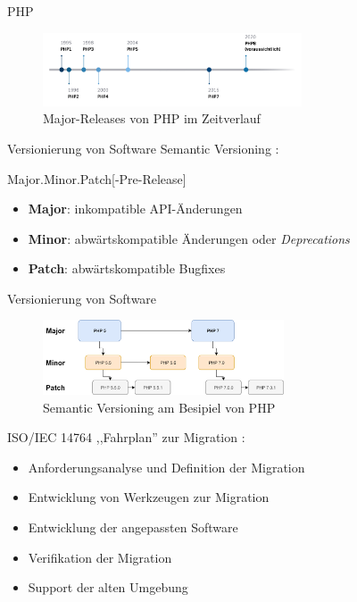 \begin{frame}{PHP}
    \begin{figure}
        \centering
        \includegraphics[width=290px]{img/timeline.png}	
        \caption{Major-Releases von PHP im Zeitverlauf}		
    \end{figure}
\end{frame}

\begin{frame}{Versionierung von Software}
    Semantic Versioning \nocite{preston-werner_semantic_nodate}:
    \begin{center}
        \alert{Major.Minor.Patch[-Pre-Release]}
    \end{center}
    \begin{itemize}
        \item \textbf{Major}: inkompatible API-Änderungen
        \item \textbf{Minor}: abwärtskompatible Änderungen oder \emph{Deprecations}
        \item \textbf{Patch}: abwärtskompatible Bugfixes
    \end{itemize}
\end{frame}

\begin{frame}{Versionierung von Software}
    \begin{figure}
        \centering
        \includegraphics[width=270px]{img/semVer.png}
        \caption{Semantic Versioning am Besipiel von PHP}			
    \end{figure}
\end{frame}

\begin{frame}{ISO/IEC 14764}
    ,,Fahrplan'' zur Migration \nocite{iso/iec_iso/iec/ieee_2006}:
    \begin{itemize}
        \item Anforderungsanalyse und Definition der Migration
        \item Entwicklung von Werkzeugen zur Migration
        \item Entwicklung der angepassten Software
        \item Verifikation der Migration
        \item Support der alten Umgebung
    \end{itemize}
\end{frame}

